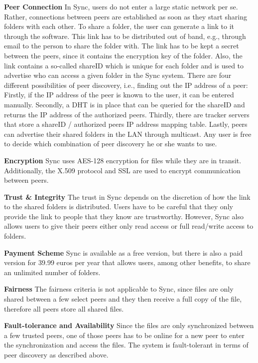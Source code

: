 \textbf{Peer Connection}
In Sync, users do not enter a large static network per se. Rather, connections between peers are established as soon as they start sharing folders with each other. To share a folder, the user can generate a link to it through the software. This link has to be distributed out of band, e.g., through email to the person to share the folder with. The link has to be kept a secret between the peers, since it contains the encryption key of the folder. Also, the link contains a so-called shareID which is unique for each folder and is used to advertise who can access a given folder in the Sync system. There are four different possibilities of peer discovery, i.e., finding out the IP address of a peer: Firstly, if the IP address of the peer is known to the user, it can be entered manually. Secondly, a DHT is in place that can be queried for the shareID and returns the IP address of the authorized peers. Thirdly, there are tracker servers that store a shareID / authorized peers IP address mapping table. Lastly, peers can advertise their shared folders in the LAN through multicast. Any user is free to decide which combination of peer discovery he or she wants to use.

\textbf{Encryption}
Sync uses AES-128 encryption for files while they are in transit. Additionally, the X.509 protocol and SSL are used to encrypt communication between peers.

\textbf{Trust \& Integrity}
The trust in Sync depends on the discretion of how the link to the shared folders is distributed. Users have to be careful that they only provide the link to people that they know are trustworthy. However, Sync also allows users to give their peers either only read access or full read/write access to folders.

\textbf{Payment Scheme}
Sync is available as a free version, but there is also a paid version for 39.99 euros per year that allows users, among other benefits, to share an unlimited number of folders.

\textbf{Fairness}
The fairness criteria is not applicable to Sync, since files are only shared between a few select peers and they then receive a full copy of the file, therefore all peers store all shared files.

\textbf{Fault-tolerance and Availability}
Since the files are only synchronized between a few trusted peers, one of those peers has to be online for a new peer to enter the synchronization and access the files. The system is fault-tolerant in terms of peer discovery as described above.

